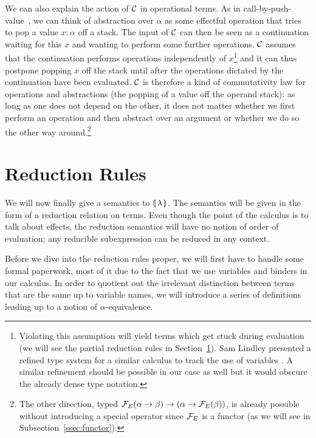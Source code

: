 We can also explain the action of $\mathcal{C}$ in operational terms. As in
call-by-push-value~\cite{levy1999call}, we can think of abstraction over
$\alpha$ as some effectful operation that tries to pop a value $x : \alpha$
off a stack. The input of $\mathcal{C}$ can then be seen as a continuation waiting
for this $x$ and wanting to perform some further operations. $\mathcal{C}$ assumes
that the continuation performs operations independently of
$x$\footnote{Violating this assumption will yield terms which get stuck
  during evaluation (we will see the partial reduction rules in
  Section~\ref{sec:reductions}). Sam Lindley presented a refined type
  system for a similar calculus to track the use of variables
  \cite{lindley2014algebraic}. A similar refinement should be possible in
  our case as well but it would obscure the already dense type notation.}
and it can thus postpone popping $x$ off the stack until after the
operations dictated by the continuation have been evaluated. $\mathcal{C}$ is
therefore a kind of commutativity law for operations and abstractions (the
popping of a value off the operand stack): as long as one does not depend
on the other, it does not matter whether we first perform an operation and
then abstract over an argument or whether we do so the other way
around.\footnote{The other direction, typed
  $\mathcal{F}_E(\alpha \to \beta) \to (\alpha \to \mathcal{F}_E(\beta))$, is already
  possible without introducing a special operator since $\mathcal{F}_E$ is a
  functor (as we will see in Subsection~\ref{ssec:functor}).}


\section{Reduction Rules}
\label{sec:reductions}

We will now finally give a semantics to ${\llparenthesis \, \lambda \, \rrparenthesis}$. The semantics will be
given in the form of a reduction relation on terms. Even though the point
of the calculus is to talk about effects, the reduction semantics will have
no notion of order of evaluation; any reducible subexpression can be
reduced in any context.

Before we dive into the reduction rules proper, we will first have to
handle some formal paperwork, most of it due to the fact that we use
variables and binders in our calculus. In order to quotient out the
irrelevant distinction between terms that are the same up to variable
names, we will introduce a series of definitions leading up to a notion of
$\alpha$-equivalence.

